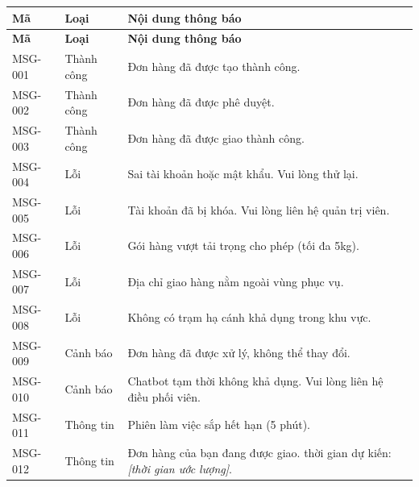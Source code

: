 \begin{longtable}{|l|l|p{9cm}|}
  \hline
  \textbf{Mã} & \textbf{Loại} & \textbf{Nội dung thông báo} \\
  \hline
  \endfirsthead
  \hline
  \textbf{Mã} & \textbf{Loại} & \textbf{Nội dung thông báo} \\
  \hline
  \endhead
  \hline
  \endfoot
  \hline
  \endlastfoot
  MSG-001 & Thành công  & Đơn hàng đã được tạo thành công. \\ \hline
  MSG-002 & Thành công  & Đơn hàng đã được phê duyệt. \\ \hline
  MSG-003 & Thành công  & Đơn hàng đã được giao thành công. \\ \hline
  MSG-004 & Lỗi         & Sai tài khoản hoặc mật khẩu. Vui lòng thử lại. \\ \hline
  MSG-005 & Lỗi         & Tài khoản đã bị khóa. Vui lòng liên hệ quản trị viên. \\ \hline
  MSG-006 & Lỗi         & Gói hàng vượt tải trọng cho phép (tối đa 5kg). \\ \hline
  MSG-007 & Lỗi         & Địa chỉ giao hàng nằm ngoài vùng phục vụ. \\ \hline
  MSG-008 & Lỗi         & Không có trạm hạ cánh khả dụng trong khu vực. \\ \hline
  MSG-009 & Cảnh báo    & Đơn hàng đã được xử lý, không thể thay đổi. \\ \hline
  MSG-010 & Cảnh báo    & Chatbot tạm thời không khả dụng. Vui lòng liên hệ điều phối viên. \\ \hline
  MSG-011 & Thông tin   & Phiên làm việc sắp hết hạn (5 phút). \\ \hline
  MSG-012 & Thông tin   & Đơn hàng của bạn đang được giao. thời gian dự kiến: \textit{[thời gian ước lượng]}. \\
\end{longtable}
